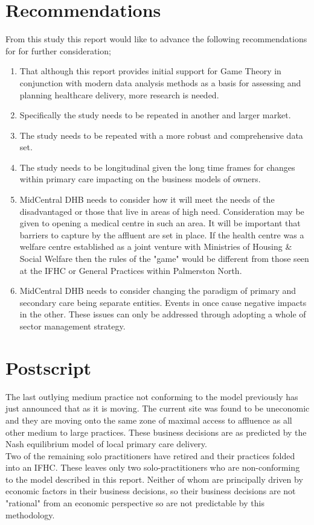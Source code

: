 \documentclass[11pt,a4paper]{article}
\begin{document}
\section{Recommendations}
 From this study this report would like to advance the following recommendations for for further consideration;
 
\begin{enumerate}
\item That although this report provides initial support for Game Theory in conjunction with modern data analysis methods as a basis for assessing and planning healthcare delivery, more research is needed.
\item Specifically the study needs to be repeated in another and larger market.
\item The study needs to be repeated with a more robust and comprehensive data set.
\item The study needs to be longitudinal given the long time frames for changes within primary care impacting on the business models of owners.
\item MidCentral DHB needs to consider how it will meet the needs of the disadvantaged or those that live in areas of high need. Consideration may be given to opening a medical centre in such an area. It will be important that barriers to capture by the affluent are set in place. If the health centre was a welfare centre established as a joint venture with Ministries of Housing \& Social Welfare then the rules of the "game" would be different from those seen at the IFHC or General Practices within Palmerston North.
\item MidCentral DHB needs to consider changing the paradigm of primary and secondary care being separate entities. Events in once cause negative impacts in the other. These issues can only be addressed through adopting a whole of sector management strategy. 
\end{enumerate}
\pagebreak

\section{Postscript}
The last outlying medium practice not conforming to the model previously has just announced that as it is moving. The current site was found to be uneconomic and they are moving onto the same zone of maximal access to affluence as all other medium to large practices. These business decisions are as predicted by the Nash equilibrium model of local primary care delivery. \\

Two of the remaining solo practitioners have retired and their practices folded into an IFHC. These leaves only two solo-practitioners who are non-conforming to the model described in this report. Neither of whom are principally driven by economic factors in their business decisions, so their business decisions are not "rational" from an economic perspective so are not predictable by this methodology.\\ 

\pagebreak


\end{document}
